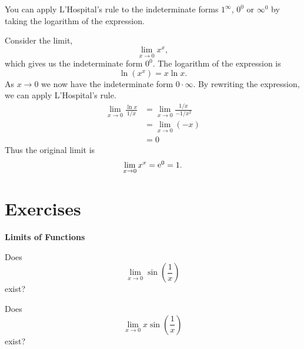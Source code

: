 You can apply L'Hospital's rule to the indeterminate forms $1^\infty$, 
$0^0$ or $\infty^0$ by taking the logarithm of the expression.


\begin{Example}
  Consider the limit,
  \[
  \lim_{x \to 0} x^x,
  \]
  which gives us the indeterminate form $0^0$.
  The logarithm of the expression is
  \[
  \ln( x^x ) = x \ln x.
  \]
  As $x \to 0$ we now have the indeterminate form $0 \cdot \infty$.  By 
  rewriting the expression, we can apply L'Hospital's rule.
  \begin{align*}
    \lim_{x \to 0} \frac{\ln x}{1/x}
    &= \lim_{x \to 0} \frac{1/x}{-1/x^2} \\
    &= \lim_{x \to 0} (-x) \\
    &= 0
  \end{align*}
  Thus the original limit is
  \[
  \lim_{x \to 0} x^x = \mathop{\mathrm{e}}\nolimits^0 = 1.
  \]
\end{Example}









\raggedbottom
\pagebreak
\flushbottom
\section{Exercises}


\begin{large}
  \noindent
  \textbf{Limits of Functions}
\end{large}


\begin{Exercise}
  \label{exercise lim sin 1/x}
  Does 
  \[
  \lim_{x \to 0} \sin \left( \frac{1}{x} \right)
  \]
  exist?

\end{Exercise}







\begin{Exercise}
  \label{exercise lim x sin 1/x}
  Does 
  \[
  \lim_{x \to 0} x \sin \left( \frac{1}{x} \right)
  \]
  exist?

\end{Exercise}


